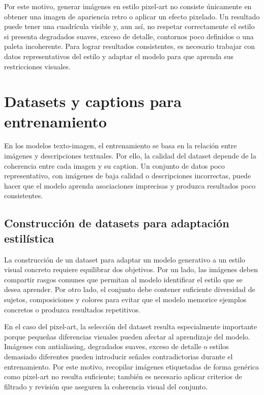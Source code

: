 \documentclass[a4paper,11pt,titlepage]{scrbook}
\begin{document}
\medskip

Por este motivo, generar imágenes en estilo pixel-art no consiste únicamente en obtener una imagen de apariencia retro o aplicar un efecto pixelado. Un resultado puede tener una cuadrícula visible y, aun así, no respetar correctamente el estilo si presenta degradados suaves, exceso de detalle, contornos poco definidos o una paleta incoherente. Para lograr resultados consistentes, es necesario trabajar con datos representativos del estilo y adaptar el modelo para que aprenda sus restricciones visuales.

\section{Datasets y captions para entrenamiento}

En los modelos texto-imagen, el entrenamiento se basa en la relación entre imágenes y descripciones textuales. Por ello, la calidad del dataset depende de la coherencia entre cada imagen y su caption. Un conjunto de datos poco representativo, con imágenes de baja calidad o descripciones incorrectas, puede hacer que el modelo aprenda asociaciones imprecisas y produzca resultados poco consistentes.

\subsection{Construcción de datasets para adaptación estilística}

La construcción de un dataset para adaptar un modelo generativo a un estilo visual concreto requiere equilibrar dos objetivos. Por un lado, las imágenes deben compartir rasgos comunes que permitan al modelo identificar el estilo que se desea aprender. Por otro lado, el conjunto debe contener suficiente diversidad de sujetos, composiciones y colores para evitar que el modelo memorice ejemplos concretos o produzca resultados repetitivos.

\medskip

En el caso del pixel-art, la selección del dataset resulta especialmente importante porque pequeñas diferencias visuales pueden afectar al aprendizaje del modelo. Imágenes con antialiasing, degradados suaves, exceso de detalle o estilos demasiado diferentes pueden introducir señales contradictorias durante el entrenamiento. Por este motivo, recopilar imágenes etiquetadas de forma genérica como pixel-art no resulta suficiente; también es necesario aplicar criterios de filtrado y revisión que aseguren la coherencia visual del conjunto.
\end{document}
